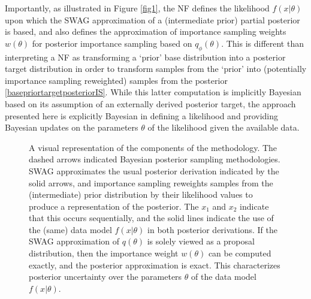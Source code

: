 \documentclass[11pt, oneside]{article}   	%
\begin{document}
Importantly, as illustrated in Figure \ref{fig1}, the NF defines the likelihood $f(x|\theta)$ upon which the SWAG approximation of a (intermediate prior) partial posterior is based, and also defines the approximation of importance sampling weights $w(\theta)$ for posterior importance sampling based on $q_\phi(\theta)$. This is different than interpreting a NF as transforming a `prior' base distribution into a posterior target distribution in order to transform samples from the `prior' into (potentially importance sampling reweighted) samples from the posterior \ref{basepriortargetposteriorIS}.  While this latter computation is implicitly Bayesian based on its assumption of an externally derived posterior target, the approach presented here is explicitly Bayesian in defining a likelihood and providing Bayesian updates on the parameters $\theta$ of the likelihood given the available data. 

\begin{figure}
\centering
{}
\caption{A visual representation of the components of the methodology. The dashed arrows indicated Bayesian posterior sampling methodologies.  SWAG approximates the usual posterior derivation indicated by the solid arrows, and importance sampling reweights samples from the (intermediate) prior distribution by their likelihood values to produce a representation of the posterior. The $x_1$ and $x_2$ indicate that this occurs sequentially, and the solid lines indicate the use of the (same) data model $f(x|\theta)$ in both posterior derivations. If the SWAG approximation of $q(\theta)$ is solely viewed as a proposal distribution, then the importance weight $w(\theta)$ can be computed exactly, and the posterior approximation is exact. This characterizes posterior uncertainty over the parameters $\theta$ of the data model $f(x|\theta)$.}
\end{figure}
\end{document}
